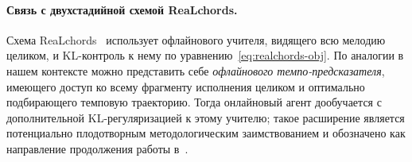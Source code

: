 \paragraph*{Связь с двухстадийной схемой ReaLchords.} Схема
ReaLchords~\cite{Wu2024ReaLchords} использует офлайнового
учителя, видящего всю мелодию целиком, и KL-контроль к нему по
уравнению~\eqref{eq:realchords-obj}. По аналогии в нашем
контексте можно представить себе \textit{офлайнового
темпо-предсказателя}, имеющего доступ ко всему фрагменту
исполнения целиком и оптимально подбирающего темповую
траекторию. Тогда онлайновый агент дообучается с дополнительной
KL-регуляризацией к этому учителю; такое расширение
является потенциально плодотворным методологическим
заимствованием и обозначено как направление продолжения работы
в~.
